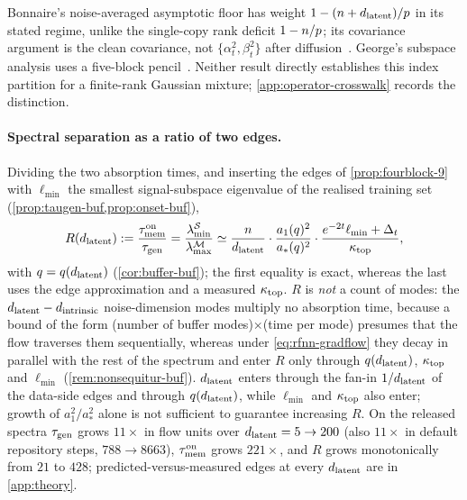 Bonnaire's noise-averaged asymptotic floor has weight $1-(n+d_{\mathrm{latent}})/p$ in its stated regime, unlike the single-copy rank deficit $1-n/p$; its covariance argument is the clean covariance, not $\{\alpha_t^2,\beta_t^2\}$ after diffusion~\citep{bonnaire2025}. George's subspace analysis uses a five-block pencil~\citep{george2025dsm}. Neither result directly establishes this index partition for a finite-rank Gaussian mixture; \cref{app:operator-crosswalk} records the distinction.

\paragraph{Spectral separation as a ratio of two edges.}\label{sec:theory-buffer}\label{prop:buffer-main}
Dividing the two absorption times, and inserting the edges of \cref{prop:fourblock-9} with $\ell_{\min}$ the smallest signal-subspace eigenvalue of the realised training set (\cref{prop:taugen-buf,prop:onset-buf}),
\begin{equation}\label{eq:R-main}
R(d_{\mathrm{latent}}):=\frac{\tau_{\mathrm{mem}}^{\rm on}}{\tau_{\mathrm{gen}}}=\frac{\lambda^{\mathcal S}_{\min}}{\lambda^{\mathcal M}_{\max}}
\simeq\frac{n}{d_{\mathrm{latent}}}\cdot\frac{a_1(q)^2}{a_*(q)^2}\cdot\frac{e^{-2t}\ell_{\min}+\Delta_t}{\kappa_{\rm top}},
\end{equation}
with $q=q(d_{\mathrm{latent}})$ (\cref{cor:buffer-buf}); the first equality is exact, whereas the last uses the edge approximation and a measured $\kappa_{\rm top}$.\label{cor:buffer-main} $R$ is \emph{not} a count of modes: the $d_{\mathrm{latent}}-d_{\mathrm{intrinsic}}$ noise-dimension modes multiply no absorption time, because a bound of the form (number of buffer modes)$\times$(time per mode) presumes that the flow traverses them sequentially, whereas under \eqref{eq:rfnn-gradflow} they decay in parallel with the rest of the spectrum and enter $R$ only through $q(d_{\mathrm{latent}})$, $\kappa_{\rm top}$ and $\ell_{\min}$ (\cref{rem:nonsequitur-buf}). $d_{\mathrm{latent}}$ enters through the fan-in $1/d_{\mathrm{latent}}$ of the data-side edges and through $q(d_{\mathrm{latent}})$, while $\ell_{\min}$ and $\kappa_{\rm top}$ also enter; growth of $a_1^2/a_*^2$ alone is not sufficient to guarantee increasing $R$. On the released spectra $\tau_{\mathrm{gen}}$ grows $11\times$ in flow units over $d_{\mathrm{latent}}=5\to200$ (also $11\times$ in default repository steps, $788\to8663$), $\tau_{\mathrm{mem}}^{\rm on}$ grows $221\times$, and $R$ grows monotonically from $21$ to $428$; predicted-versus-measured edges at every $d_{\mathrm{latent}}$ are in \cref{app:theory}.

